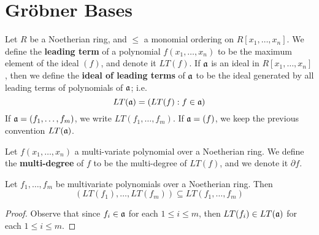 \section{Gr\"obner Bases}
\label{section_7.6}

\begin{definition}
  Let $R$ be a Noetherian ring, and $\leq$ a monomial ordering on
  $R[x_1, \dots, x_n]$. We define the \textbf{leading term} of a
  polynomial $f(x_1, \dots, x_n)$ to be the maximum element of the
  ideal $(f)$, and denote it $LT(f)$. If $\mathfrak{a}$ is an ideal in $R[x_1,
  \dots, x_n]$, then we define the \textbf{ideal of leading terms} of
  $\mathfrak{a}$ to be the ideal generated by all leading terms of polynomials
  of $\mathfrak{a}$; i.e.
  \begin{equation*}
    LT(\mathfrak{a})=(LT(f) : f \in \mathfrak{a})
  \end{equation*}
  If $\mathfrak{a}=(f_1, \dots, f_m)$, we write $LT(f_1, \dots, f_m)$. If
  $\mathfrak{a}=(f)$, we keep the previous convention $LT(\mathfrak{a})$.
\end{definition}

\begin{definition}
  Let $f(x_1, \dots, x_n)$ a multi-variate polynomial over a
  Noetherian ring. We define the \textbf{multi-degree} of $f$ to be
  the multi-degree of $LT(f)$, and we denote it $\partial{f}$.
\end{definition}

\begin{proposition}\label{proposition_7.6.1}
  Let $f_1, \dots, f_m$ be multivariate polynomials over a Noetherian
  ring. Then
  \begin{equation*}
    (LT(f_1), \dots, LT(f_m)) \subseteq LT(f_1, \dots, f_m)
  \end{equation*}
\end{proposition}
\begin{proof}
  Observe that since $f_i \in \mathfrak{a}$ for each $1 \leq i \leq m$, then
  $LT(f_i) \in LT(\mathfrak{a})$ for each $1 \leq i \leq m$.
\end{proof}


